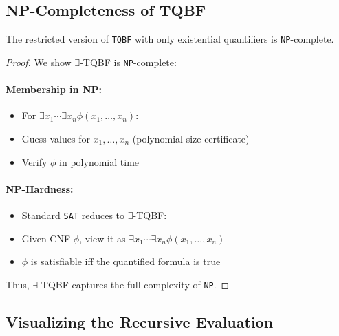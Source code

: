 \subsection{NP-Completeness of TQBF}

\begin{theorem}
The restricted version of \texttt{TQBF} with only existential quantifiers is \texttt{NP}-complete.
\end{theorem}

\begin{proof}
We show $\exists$-TQBF is \texttt{NP}-complete:

\paragraph{Membership in NP:}
\begin{itemize}
    \item For $\exists x_1 \cdots \exists x_n \phi(x_1,\ldots,x_n)$:
    \item Guess values for $x_1,\ldots,x_n$ (polynomial size certificate)
    \item Verify $\phi$ in polynomial time
\end{itemize}

\paragraph{NP-Hardness:}
\begin{itemize}
    \item Standard \texttt{SAT} reduces to $\exists$-TQBF:
    \item Given CNF $\phi$, view it as $\exists x_1 \cdots \exists x_n \phi(x_1,\ldots,x_n)$
    \item $\phi$ is satisfiable iff the quantified formula is true
\end{itemize}

Thus, $\exists$-TQBF captures the full complexity of \texttt{NP}.
\end{proof}

\subsection{Visualizing the Recursive Evaluation}

